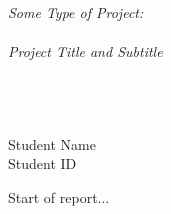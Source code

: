 \documentclass{article}
\begin{document}
\thispagestyle{empty}

\vspace*{\fill}

\begin{center}


\vspace{20pt}

\color{darkblue}
\Huge \em
Some Type of Project: \\
\ \\
Project Title and  Subtitle\\

\ \\


\ \\ 
\ \\

\large
Student Name \\
Student ID

\vspace{20pt}


\end{center}

\vfill

\clearpage

\setcounter{page}{1}

Start of report...
\end{document}

